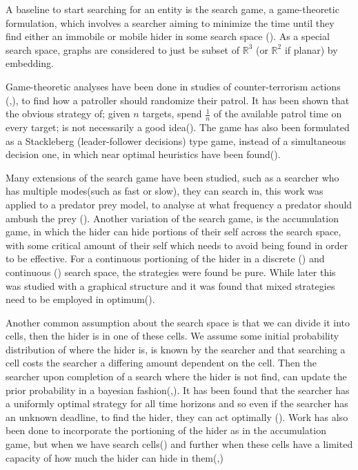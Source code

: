 \documentclass[a4paper,10pt]{article}
\theoremstyle{definition}
\theoremstyle{definition}
\theoremstyle{remark}
\theoremstyle{definition}
\begin{document}
A baseline to start searching for an entity is the search game, a game-theoretic formulation, which involves a searcher aiming to minimize the time until they find either an immobile or mobile hider in some search space (\cite{Steve2003}). As a special search space, graphs are considered to just be subset of $\mathbb{R}^{3}$ (or $\mathbb{R}^{2}$ if planar) by embedding.

Game-theoretic analyses have been done in studies of counter-terrorism actions (\cite{Brown2006},\cite{Lindelauf2009}), to find how a patroller should randomize their patrol. It has been shown that the obvious strategy of; given $n$ targets, spend $\frac{1}{n}$ of the available patrol time on every target; is not necessarily a good idea(\cite{Fox}). The game has also been formulated as a Stackleberg (leader-follower decisions) type game, instead of a simultaneous decision one, in which near optimal heuristics have been found(\cite{Paruchuri2008}).

Many extensions of the search game have been studied, such as a searcher who has multiple modes(such as fast or slow), they can search in, this work was applied to a predator prey model, to analyse at what frequency a predator should ambush the prey (\cite{Alpern2011a}). Another variation of the search game, is the accumulation game, in which the hider can hide portions of their self across the search space, with some critical amount of their self which needs to avoid being found in order to be effective. For a continuous portioning of the hider in a discrete (\cite{Kikuta2002a}) and continuous (\cite{Ruckle2000}) search space, the strategies were found be pure. While later this was studied with a graphical structure and it was found that mixed strategies need to be employed in optimum(\cite{Alpern2014}).

Another common assumption about the search space is that we can divide it into cells, then the hider is in one of these cells. We assume some initial probability distribution of where the hider is, is known by the searcher and that searching a cell costs the searcher a differing amount dependent on the cell. Then the searcher upon completion of a search where the hider is not find, can update the prior probability in a bayesian fashion(\cite{Black1965},\cite{Matula1964}). It has been found that the searcher has a uniformly optimal strategy for all time horizons and so even if the searcher has an unknown deadline, to find the hider, they can act optimally (\cite{Lin2016}). Work has also been done to incorporate the portioning of the hider as in the accumulation game, but when we have search cells(\cite{Ruckle1983}) and further when these cells have a limited capacity of how much the hider can hide in them(\cite{Zoroa1999},\cite{Zoroa2004})
\end{document}
